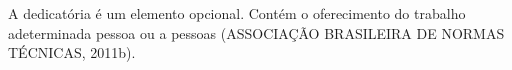 A dedicatória é um elemento opcional. Contém o oferecimento do trabalho adeterminada pessoa ou a pessoas (ASSOCIAÇÃO BRASILEIRA DE NORMAS TÉCNICAS, 2011b).